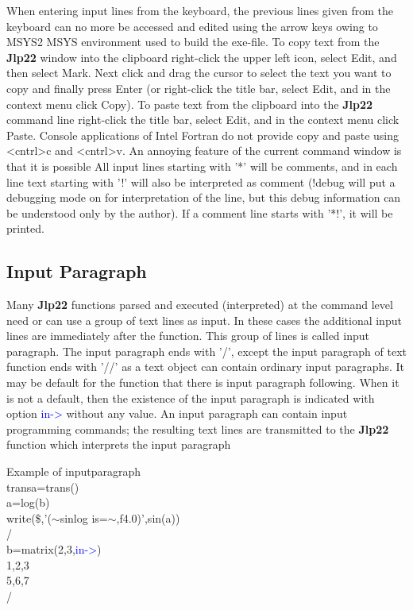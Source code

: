 When entering input lines from the keyboard, the previous lines given from the keyboard can no more be
accessed and edited using the arrow keys owing to MSYS2 MSYS environment used to build the exe-file.
To copy text from the \textbf{Jlp22} window into the clipboard right-click the upper left icon, select Edit,
and then select Mark. Next click and drag the cursor to select the text you want to copy and
finally press Enter (or right-click the title bar, select Edit, and in the context menu click Copy).
To paste text from the clipboard into the \textbf{Jlp22} command line right-click the title bar, select Edit,
and in the context menu click Paste. Console applications of Intel Fortran do not provide copy
and paste using <cntrl>c and <cntrl>v. An annoying feature of the current command window is that it is possible
All input lines starting with '*' will be comments, and in each line text starting with '!' will also
be interpreted as comment (!debug will put a debugging mode on for interpretation of the
line, but this debug information can be understood only by the author). If a comment line starts
with '*!', it will be printed.
\subsection{Input Paragraph}
\label{inpupara}
Many \textbf{Jlp22} functions parsed and executed (interpreted) at the command level need or can use a group of
text lines as input. In these cases the additional input lines are immediately after the function.
This group of lines is called input paragraph. The input paragraph ends with '/', except the
input paragraph of text function ends with '//' as a text object can contain ordinary input
paragraphs. It may be default for the function that there is input paragraph following. When
it is not a default, then the existence of the input paragraph is indicated with option \textcolor{blue}{in->}
without any value. An input paragraph can contain input programming commands; the
resulting text lines are transmitted to the \textbf{Jlp22} function which interprets the input paragraph
\begin{example}[inpuparag]Example of inputparagraph\\
\label{inpuparag}
transa=\textcolor{VioletRed}{trans}()\\
a=\textcolor{VioletRed}{log}(b)\\
\textcolor{VioletRed}{write}(\$,'($\sim$sinlog is=$\sim$,f4.0)',\textcolor{VioletRed}{sin}(a))\\
/\\
b=\textcolor{VioletRed}{matrix}(2,3,\textcolor{blue}{in->})\\
1,2,3\\
5,6,7\\
/
\end{example}
